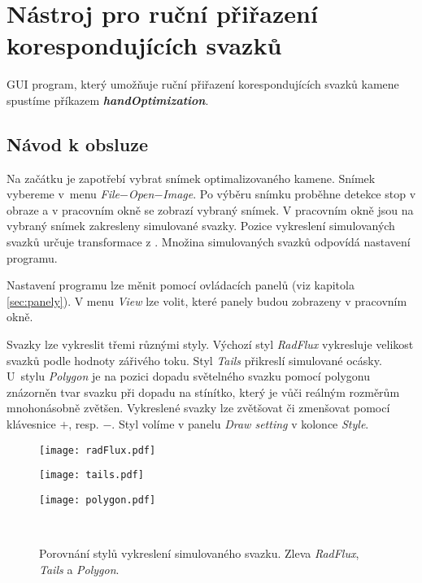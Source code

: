 \section{Nástroj pro ruční přiřazení korespondujících svazků}
\label{sec:handOptim}
GUI program, který umožňuje ruční přiřazení korespondujících svazků kamene spustíme příkazem \textbf{\textit{handOptimization}}.

\subsection{Návod k obsluze}
\label{sec:snimek}

 Na začátku je zapotřebí vybrat snímek optimalizovaného kamene. Snímek vybereme v~menu \textit{File}$-$\textit{Open}$-$\textit{Image}. Po výběru snímku proběhne detekce stop v obraze a v pracovním okně se zobrazí vybraný snímek. V pracovním okně jsou na vybraný snímek zakresleny simulované svazky. Pozice vykreslení simulovaných svazků určuje transformace z \cite{Drapela}. Množina simulovaných svazků odpovídá nastavení programu. 
 
 Nastavení programu lze měnit pomocí ovládacích panelů (viz kapitola \ref{sec:panely}). V menu \textit{View} lze volit, které panely budou zobrazeny v pracovním okně.  
 
Svazky lze vykreslit třemi různými styly. Výchozí styl \textit{RadFlux} vykresluje velikost svazků podle hodnoty zářivého toku. Styl \textit{Tails} přikreslí simulované ocásky. U~stylu \textit{Polygon} je na pozici dopadu světelného svazku pomocí polygonu znázorněn tvar svazku při dopadu na stínítko, který je vůči reálným rozměrům mnohonásobně zvětšen. Vykreslené svazky lze zvětšovat či zmenšovat pomocí klávesnice $+$, resp. $-$. Styl volíme v panelu \textit{Draw setting} v kolonce \textit{Style}. 

\begin{figure}[h!]
   \centering
   \begin{minipage}[c]{0.3\textwidth}
     \centering \texttt{[image: radFlux.pdf]} 
   \end{minipage}
   \begin{minipage}[c]{0.3\textwidth}
     \centering \texttt{[image: tails.pdf]} 
   \end{minipage}
   \begin{minipage}[c]{0.3\textwidth}
     \centering \texttt{[image: polygon.pdf]}
   \end{minipage}
   \\
   \caption[Porovnání stylů vykreslení simulovaného svazku.]{Porovnání stylů vykreslení simulovaného svazku. Zleva \textit{RadFlux}, \textit{Tails} a \textit{Polygon}. }

\label{fig: vykresleni}
\end{figure}

